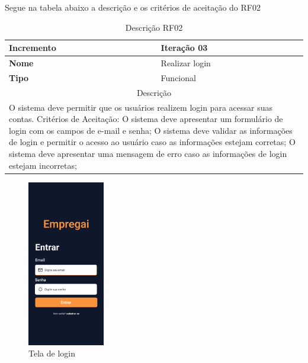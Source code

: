 \clearpage
Segue na tabela abaixo a descrição e os critérios de aceitação do RF02
\begin{table}[htb]
	\centering
	\caption{\label{Formatação do texto.}Descrição RF02}	
	\begin{tabular}{|l|p{11cm}|}
		\hline
		\textbf{Incremento}    & Iteração 03\\ \hline
		\textbf{Nome}    & Realizar login\\ \hline
		\textbf{Tipo}    & Funcional\\ \hline
		\multicolumn{2}{|c|}{Descrição}\\ \hline
		\multicolumn{2}{|p{12cm}|}{
			O sistema deve permitir que os usuários realizem login para acessar suas contas. \newline
			\newline Critérios de Aceitação: \newline
			O sistema deve apresentar um formulário de login com os campos de e-mail e senha; \newline
			\newline O sistema deve validar as informações de login e permitir o acesso ao usuário caso as informações estejam corretas;\newline
			\newline O sistema deve apresentar uma mensagem de erro caso as informações de login estejam incorretas;
			}\\ \hline
	\end{tabular}
\end{table}

\clearpage
\begin{figure}[htb]
	\caption{Tela de login}
	\begin{center}
		\includegraphics[width=0.3\textwidth]{images/RF02.png}
	\end{center}
\end{figure}


